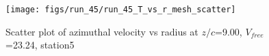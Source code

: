 \begin{figure}[H]
\centering
\texttt{[image: figs/run\_45/run\_45\_T\_vs\_r\_mesh\_scatter]}
\caption{Scatter plot of azimuthal velocity vs radius at $z/c$=9.00, $V_{free}$=23.24, station5}
\label{fig:run_45_T_vs_r_mesh_scatter}
\end{figure}


